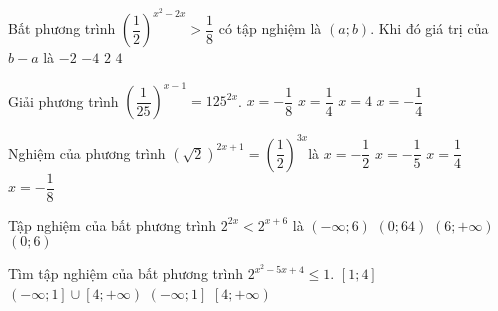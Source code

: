\begin{ex}%
	Bất phương trình ${\left( \dfrac{1}{2} \right)}^{x^2-2x}>\dfrac{1}{8}$ có tập nghiệm là $\left( a;b \right)$. Khi đó giá trị của $b-a$ là
	\choice
	{ $-2$}
	{ $-4$}
	{ $2$}
	{\True  $4$}
\end{ex}

\begin{ex}%
	Giải phương trình $\left( \dfrac{1}{25} \right)^{x-1}={125}^{2x}$.
	\choice
	{ $x=-\dfrac{1}{8}$}
	{\True  $x=\dfrac{1}{4}$}
	{ $x=4$}
	{ $x=-\dfrac{1}{4}$}
\end{ex}

\begin{ex}%
	Nghiệm của phương trình $\left( \sqrt{2} \right)^{2x+1}=\left( \dfrac{1}{2} \right)^{3x}$là
	\choice
	{ $x=-\dfrac{1}{2}$}
	{ $x=-\dfrac{1}{5}$}
	{ $x=\dfrac{1}{4}$}
	{\True  $x=-\dfrac{1}{8}$}
\end{ex}

\begin{ex}%
	Tập nghiệm của bất phương trình $2^{2x}<2^{x+6}$ là
	\choice
	{\True  $\left( -\infty ;6 \right)$}
	{ $\left( 0;64 \right)$}
	{ $\left( 6;+\infty  \right)$}
	{ $\left( 0;6 \right)$}
\end{ex}

\begin{ex}%
	Tìm tập nghiệm của bất phương trình $2^{x^2-5x+4}\le 1$.
	\choice
	{\True  $\left[ 1;4 \right]$}
	{ $\left( -\infty ;1 \right]\cup \left[ 4;+\infty  \right)$}
	{ $\left( -\infty ;1 \right]$}
	{ $\left[ 4;+\infty  \right)$}
\end{ex}

